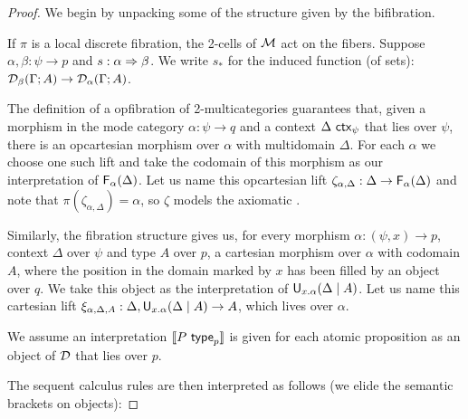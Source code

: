 \begin{proof}
We begin by unpacking some of the structure given by the bifibration.

If $\pi$ is a local discrete fibration, the 2-cells of $\mathcal{M}$ act on the
fibers. Suppose $\alpha, \beta : \psi \to p$ and $s : \alpha \Rightarrow
\beta$. We write $s_*$ for the induced function (of sets):
$\mathcal{D}_\beta(\Gamma; A) \to \mathcal{D}_\alpha(\Gamma; A)$.  

The definition of a opfibration of 2-multicategories guarantees that,
given a morphism in the mode category $\alpha : \psi \to q$ and a
context $\Delta \,\, \mathsf{ctx}_{\psi}$ that lies over $\psi$, there is an
opcartesian morphism over $\alpha$ with multidomain $\Delta$. For each
$\alpha$ we choose one such lift and take the codomain of this morphism
as our interpretation of $\mathsf{F}_{\alpha}(\Delta)$. Let us name this
opcartesian lift $\zeta_{\alpha, \Delta} : \Delta \to
\mathsf{F}_{\alpha}(\Delta)$ and note that $\pi(\zeta_{\alpha, \Delta}) =
\alpha$, so $\zeta$ models the axiomatic \FR.

Similarly, the fibration structure gives us, for every morphism $\alpha
: (\psi,x) \to p$, context $\Delta$ over $\psi$ and type $A$ over $p$, a
cartesian morphism over $\alpha$ with codomain $A$, where the position
in the domain marked by $x$ has been filled by an object over $q$. We
take this object as the interpretation of $\mathsf{U}_{x.\alpha}(\Delta \mid A)$.
Let us name this cartesian lift $\xi_{\alpha, \Delta,A} :
\Delta,\mathsf{U}_{x.\alpha}(\Delta \mid A) \to A$, which lives over $\alpha$.

We assume an interpretation $\llbracket P \,\, \mathsf{type}_{p} \rrbracket$ is given for each
atomic proposition as an object of $\mathcal{D}$ that lies over $p$.  

The sequent calculus rules are then interpreted as follows (we elide the
semantic brackets on objects):


\end{proof}
